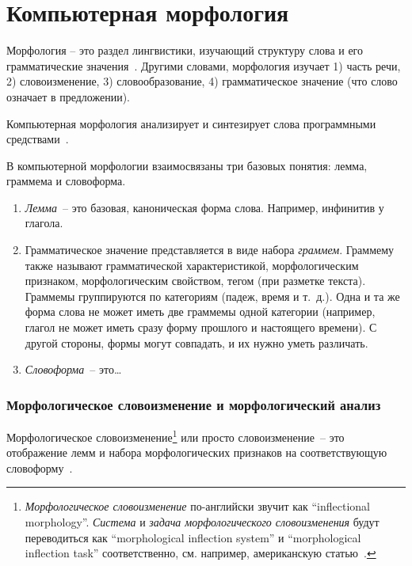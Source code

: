 \section{Компьютерная морфология}\label{sect_review_comp_morphology}

Морфология -- это раздел лингвистики, изучающий структуру слова и его грамматические значения~\cite{MitreninaNikolaevLando2016}. Другими словами, морфология изучает
1) часть речи,
2) словоизменение,
3) словообразование,
4) грамматическое значение (что слово означает в предложении). 

Компьютерная морфология анализирует и синтезирует слова программными средствами~\cite{MitreninaNikolaevLando2016}. 

В компьютерной морфологии взаимосвязаны три базовых понятия: лемма, граммема и словоформа.
\begin{enumerate}
    \item \emph{Лемма}~-- это базовая, каноническая форма слова. 
        Например, инфинитив у глагола.

    \item Грамматическое значение представляется в виде набора \emph{граммем}. 
        Граммему также называют грамматической характеристикой, 
          морфологическим признаком, морфологическим свойством, 
          тегом (при разметке текста). 
        Граммемы группируются по категориям (падеж, время и т.~д.). 
        Одна и та же форма слова не может иметь две граммемы одной категории 
        (например, глагол не может иметь сразу форму прошлого и настоящего времени). 
        С другой стороны, формы могут совпадать, и их нужно уметь различать. 

    \item \emph{Словоформа}~-- это\ldots {}
\end{enumerate}


\subsubsection{Морфологическое словоизменение и морфологический анализ}

Морфологическое словоизменение\footnote{%
    \emph{Морфологическое словоизменение} по-английски звучит как
    ``inflectional morphology''. 
    \emph{Система} и \emph{задача морфологического словоизменения} 
    будут переводиться как 
    ``morphological inflection system'' и ``morphological inflection task'' соответственно, 
    см. например, американскую статью~\cite{King2020seq2seqRussianMA}.
} или просто словоизменение~--
это отображение лемм и набора морфологических признаков 
на соответствующую словоформу~\cite[2821]{Cruz-Anastasopoulos-Stump2020Chatino}.

